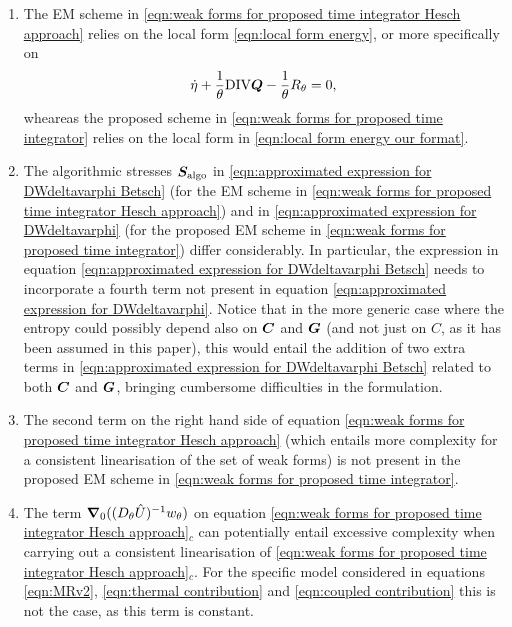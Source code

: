 \begin{enumerate}
	\item The EM scheme in \eqref{eqn:weak forms for proposed time integrator Hesch approach} relies on the local form \eqref{eqn:local form energy}, or more specifically on
	\begin{equation}
	\dot{\eta} + \frac{1}{\theta}\text{DIV}\boldsymbol{Q} - \frac{1}{\theta}R_{\theta}  = 0,
\end{equation}
%
wheareas the proposed scheme in \eqref{eqn:weak forms for proposed time integrator} relies on the local form in \eqref{eqn:local form energy our format}.

\item The algorithmic stresses $\boldsymbol{S}_{\text{algo}}$ in \eqref{eqn:approximated expression for DWdeltavarphi Betsch} (for the EM scheme in \ref{eqn:weak forms for proposed time integrator Hesch approach}) and in \eqref{eqn:approximated expression for DWdeltavarphi} (for the proposed EM scheme in \eqref{eqn:weak forms for proposed time integrator}) differ considerably. In particular, the expression in equation \eqref{eqn:approximated expression for DWdeltavarphi Betsch} needs to incorporate a fourth term not present in equation \eqref{eqn:approximated expression for DWdeltavarphi}. Notice that in the more generic case where the entropy could possibly depend also on $\boldsymbol{C}$ and $\boldsymbol{G}$ (and not just on $C$, as it has been assumed in this paper), this would entail the addition of two extra terms in \eqref{eqn:approximated expression for DWdeltavarphi Betsch} related to both $\boldsymbol{C}$ and $\boldsymbol{G}$, bringing cumbersome difficulties in the formulation.

\item The second term on the right hand side of equation \eqref{eqn:weak forms for proposed time integrator Hesch approach} (which entails more complexity for a consistent linearisation of the set of weak forms) is not present in the proposed EM scheme in \eqref{eqn:weak forms for proposed time integrator}.

\item The term $\boldsymbol{\nabla}_0((D_{\theta}\hat{U})^{-1}w_{\theta})$ on equation \eqref{eqn:weak forms for proposed time integrator Hesch approach}$_c$ can potentially entail excessive complexity when carrying out a consistent linearisation of \eqref{eqn:weak forms for proposed time integrator Hesch approach}$_c$. For the specific model considered in equations \eqref{eqn:MRv2}, \eqref{eqn:thermal contribution} and \eqref{eqn:coupled contribution} this is not the case, as this term is constant.%


\end{enumerate}
